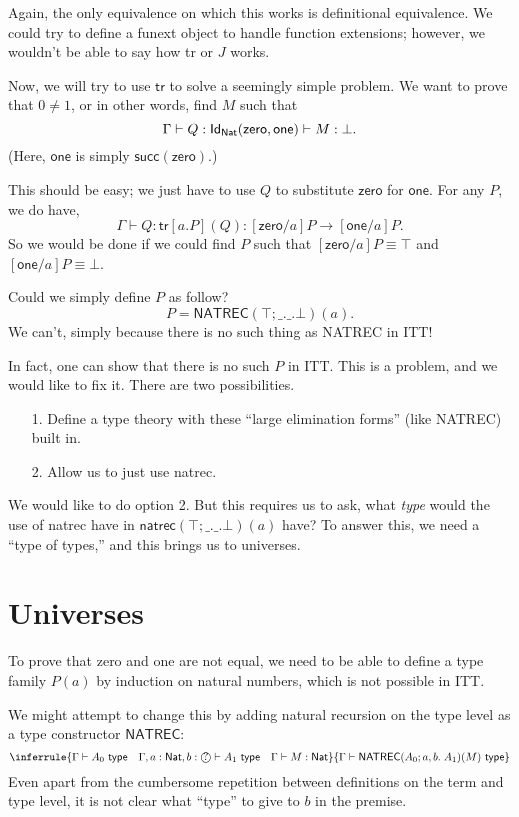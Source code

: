\documentclass{article} \usepackage{chtt-notes} \usepackage{stmaryrd}
\newcommand{\entails}{\vdash}
\newcommand{\G}{\Gamma}
\newcommand{\atype}[1]{#1~\mathsf{type}}
\newcommand{\Nat}{\mathsf{Nat}}
\newcommand{\circled}[1]{\text{\textcircled{#1}}}
\newcommand{\tr}{\textsf{tr}}
\newcommand{\one}{\textsf{one}}
\newcommand{\zero}{\textsf{zero}}
\begin{document}
Again, the only equivalence on which this works is definitional equivalence.
We could try to define a \textsf{funext} object to handle function extensions; however,
we wouldn't be able to say how \textsf{tr} or $J$ works.

Now, we will try to use $\tr$ to solve a seemingly simple problem. We want to prove that
$0 \ne 1$, or in other words, find $M$ such that
\[
  \G \entails Q : \Id{\textsf{Nat}}{\zero}{\one} \entails M : \bot.
\]
(Here, $\one$ is simply $\textsf{succ}(\zero)$.)

This should be easy; we just have to use $Q$ to substitute $\zero$ for $\one$.
For any $P$, we do have,
\[
  \G \entails Q : \tr[a.P](Q) : [\zero / a]P \to [\one / a]P.
\]
So we would be done if we could find $P$ such that $[\zero / a]P \equiv \top$ and $[\one / a]P \equiv \bot$.

Could we simply define $P$ as follow?
\[ 
  P = \textsf{NATREC}(\top; \_.\_. \bot)(a).
\]
We can't, simply because there is no such thing as \textsf{NATREC} in ITT!

In fact, one can show that there is no such $P$ in ITT. This is a problem, and we would like
to fix it. There are two possibilities.
\begin{enumerate}
\item[1.] Define a type theory with these ``large elimination forms'' (like \textsf{NATREC}) built in.
\item[2.] Allow us to just use \textsf{natrec}.
\end{enumerate}

We would like to do option 2. But this requires us to ask, what \emph{type} would the
use of \textsf{natrec} have in
$\textsf{natrec}(\top; \_.\_. \bot)(a)$ have? To answer this, we need a ``type of types,''
and this brings us to universes.
  
\section{Universes}%
%
To prove that zero and one are not equal, we need to be able to define a type family $P(a)$ by induction on natural numbers, which is not possible in ITT.

We might attempt to change this by adding natural recursion on the type level as a type constructor $\textsf{NATREC}$:
\[ \inferrule{\G \entails \atype{A_0} \quad \G, a: \Nat, b: \circled{?} \entails \atype{A_1} \quad \G \entails M : \Nat}{\G \entails \atype{\textsf{NATREC}(A_0; a,b.\; A_1)(M)}} \]
Even apart from the cumbersome repetition between definitions on the term and type level, it is not clear what ``type'' to give to $b$ in the premise.
\end{document}

